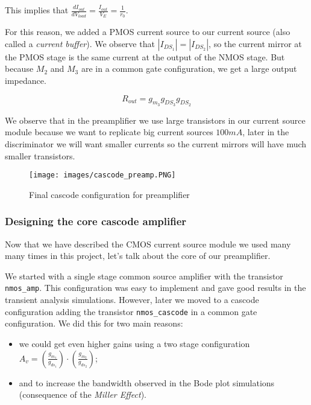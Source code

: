 \documentclass[a4paper,12pt,twoside]{article}
\begin{document}
	This implies that $\frac{d I_{out}}{d V_{load}} = \frac{I_{out}}{V_E} = \frac{1}{r_0}$.
	
	For this reason, we added a PMOS current source to our current source (also called a \textit{current buffer}). We observe that $|I_{DS_1}| = |I_{DS_2}|$, so the current mirror at the PMOS stage is the same current at the output of the NMOS stage. But because $M_2$ and $M_3$ are in a common gate configuration, we get a large output impedance.
	
	\begin{equation}
		R_{out} = g_{m_3} g_{DS_3} g_{DS_2} 
	\end{equation}
	
	We observe that in the preamplifier we use large transistors in our current source module because we want to replicate big current sources $100 mA$, later in the discriminator we will want smaller currents so the current mirrors will have much smaller transistors.
	
	\begin{figure}[h!]
		\centering
		\texttt{[image: images/cascode\_preamp.PNG]}
		\label{Cascode_preamp}
		\caption{Final cascode configuration for preamplifier}
	\end{figure}
	
	\subsubsection{Designing the core cascode amplifier}
	
	Now that we have described the CMOS current source module we used many many times in this project, let's talk about the core of our preamplifier.
	
	We  started with a single stage common source amplifier with the transistor \texttt{nmos\_amp}. This configuration was easy to implement and gave good results in the transient analysis simulations. However, later we moved to a cascode configuration adding the transistor \texttt{nmos\_cascode} in a common gate configuration. We did this for two main reasons:
	\begin{itemize}
		\item we could get even higher gains using a two stage configuration $A_v = \left(\frac{g_{m_1}}{g_{ds_1}}\right)\cdot \left(\frac{g_{m_2}}{g_{ds_2}}\right)$;
		\item and to increase the bandwidth observed in the Bode plot simulations (consequence of the \textit{Miller Effect}).
	\end{itemize}
	
\end{document}
